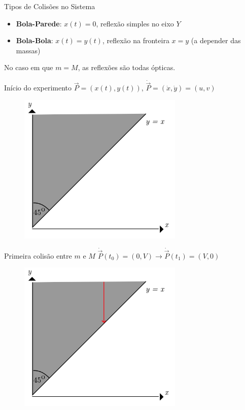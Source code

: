 \documentclass{beamer}
\begin{document}
\begin{frame}{Tipos de Colisões no Sistema}
  \begin{itemize}
    \item \textbf{Bola-Parede}: $x(t)=0$, reflexão simples no eixo $Y$
    \item \textbf{Bola-Bola}: $x(t)=y(t)$, reflexão na fronteira $x=y$ (a depender das massas)
  \end{itemize}
  No caso em que $m=M$, as reflexões são todas ópticas.
\end{frame}

\begin{frame}{Início do experimento}
  $\vec{P}=(x(t), y(t))$, $\dot{\vec{P}}=(\dot x,\dot y)=(u, v)$
  \begin{figure}
    \centering
    \includegraphics[width=0.7\textwidth]{images/image1-1.png}
  \end{figure}
\end{frame}

\begin{frame}{Primeira colisão entre $m$ e $M$}
  $\dot{\vec{P}}(t_0)=(0,V)\to\dot{\vec{P}}(t_1)=(V,0)$
  \begin{figure}
    \centering
    \includegraphics[width=0.7\textwidth]{images/image1-2.png}
  \end{figure}
\end{frame}
\end{document}
